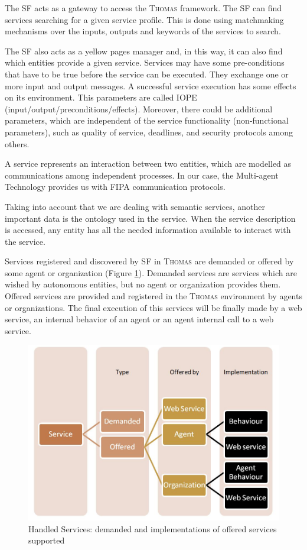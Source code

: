 The SF acts as a gateway to access the \textsc{Thomas} framework. The SF can find services searching for a given service profile. This is done using matchmaking mechanisms over the inputs, outputs and keywords of the services to search.

The SF also acts as a yellow pages manager and, in this way, it can also find which entities provide a given service. Services may have some pre-conditions that have to be true before the service can be executed. They exchange one or more input and output messages. A successful service execution has some effects on its environment. This parameters are called IOPE (input/output/preconditions/effects). Moreover, there could be additional parameters, which are independent of the service functionality (non-functional parameters), such as quality of service, deadlines, and security protocols among others.


A service represents an interaction between two entities, which are modelled as communications among independent processes. In our case, the Multi-agent Technology provides us with FIPA communication protocols.

Taking into account that we are dealing with semantic services, another important data is the ontology used in the service. When the service description is accessed, any entity has all the needed information available to interact with the service.

Services registered and discovered by SF in \textsc{Thomas} are demanded or offered by some agent or organization (Figure \ref{fig:handledServices}). Demanded services are services which are wished by autonomous entities, but no agent or organization provides them. Offered services are provided and registered in the \textsc{Thomas} environment by agents or organizations. The final execution of this services will be finally made by a web service, an internal behavior of an agent or an agent internal call to a web service.

\begin{figure}[h!t]
	\centering
	\includegraphics[width=.8\textwidth]{Thomas/images/handledServices.jpg}
	\caption{Handled Services: demanded and implementations of offered services supported}
	\label{fig:handledServices}
\end{figure}


